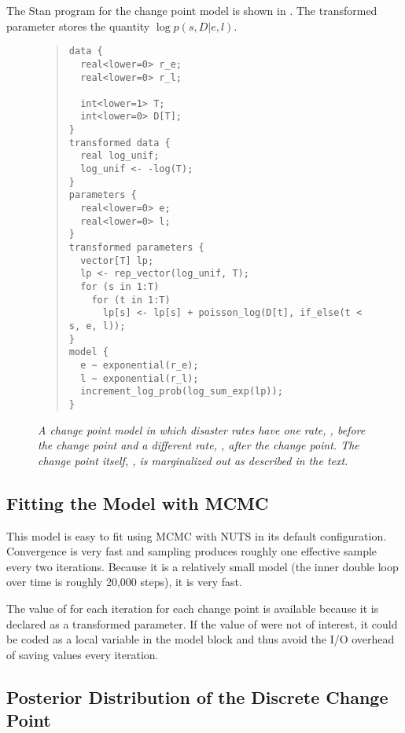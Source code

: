 The Stan program for the change point model is shown in
.  The transformed parameter
 stores the quantity $\log p(s,D|e,l)$.
%
\begin{figure}
\begin{quote}\small
\begin{Verbatim}
data {
  real<lower=0> r_e;
  real<lower=0> r_l;

  int<lower=1> T;
  int<lower=0> D[T];
}
transformed data {
  real log_unif;
  log_unif <- -log(T);
}
parameters {
  real<lower=0> e;
  real<lower=0> l;
}
transformed parameters {
  vector[T] lp;
  lp <- rep_vector(log_unif, T);
  for (s in 1:T)
    for (t in 1:T)
      lp[s] <- lp[s] + poisson_log(D[t], if_else(t < s, e, l));
}
model {
  e ~ exponential(r_e);
  l ~ exponential(r_l);
  increment_log_prob(log_sum_exp(lp));
}    
\end{Verbatim}
\end{quote}
\vspace*{-6pt}
\caption{\small\it A change point model in which disaster rates
   have one rate, , before the change point and a
  different rate, , after the change point.  The change point
  itself, , is marginalized out as described in the
  text.}\label{change-point-model.figure}
\end{figure}

\subsection{Fitting the Model with MCMC}

This model is easy to fit using MCMC with NUTS in its default
configuration.  Convergence is very fast and sampling produces roughly
one effective sample every two iterations.  Because it is a relatively
small model (the inner double loop over time is roughly 20,000 steps),
it is very fast.

The value of  for each iteration for each change point is
available because it is declared as a transformed parameter.  If the
value of  were not of interest, it could be coded as a local
variable in the model block and thus avoid the I/O overhead of saving
values every iteration.

\subsection{Posterior Distribution of the Discrete Change Point}

